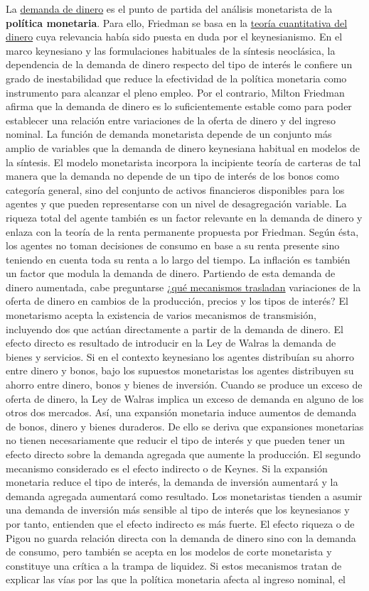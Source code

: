 \documentclass{nuevotema}
\begin{document}
La \underline{demanda de dinero} es el punto de partida del análisis monetarista de la \textbf{política monetaria}. Para ello, Friedman se basa en la \underline{teoría cuantitativa del dinero} cuya relevancia había sido puesta en duda por el keynesianismo. En el marco keynesiano y las formulaciones habituales de la síntesis neoclásica, la dependencia de la demanda de dinero respecto del tipo de interés le confiere un grado de inestabilidad que reduce la efectividad de la política monetaria como instrumento para alcanzar el pleno empleo. Por el contrario, Milton Friedman afirma que la demanda de dinero es lo suficientemente estable como para poder establecer una relación entre variaciones de la oferta de dinero y del ingreso nominal. La función de demanda monetarista depende de un conjunto más amplio de variables que la demanda de dinero keynesiana habitual en modelos de la síntesis. El modelo monetarista incorpora la incipiente teoría de carteras de tal manera que la demanda no depende de un tipo de interés de los bonos como categoría general, sino del conjunto de activos financieros disponibles para los agentes y que pueden representarse con un nivel de desagregación variable. La riqueza total del agente también es un factor relevante en la demanda de dinero y enlaza con la teoría de la renta permanente propuesta por Friedman. Según ésta, los agentes no toman decisiones de consumo en base a su renta presente sino teniendo en cuenta toda su renta a lo largo del tiempo. La inflación es también un factor que modula la demanda de dinero. Partiendo de esta demanda de dinero aumentada, cabe preguntarse ¿\underline{qué mecanismos trasladan} variaciones de la oferta de dinero en cambios de la producción, precios y los tipos de interés? El monetarismo acepta la existencia de varios mecanismos de transmisión, incluyendo dos que actúan directamente a partir de la demanda de dinero. El efecto directo es resultado de introducir en la Ley de Walras la demanda de bienes y servicios. Si en el contexto keynesiano los agentes distribuían su ahorro entre dinero y bonos, bajo los supuestos monetaristas los agentes distribuyen su ahorro entre dinero, bonos y bienes de inversión. Cuando se produce un exceso de oferta de dinero, la Ley de Walras implica un exceso de demanda en alguno de los otros dos mercados. Así, una expansión monetaria induce aumentos de demanda de bonos, dinero y bienes duraderos. De ello se deriva que expansiones monetarias no tienen necesariamente que reducir el tipo de interés y que pueden tener un efecto directo sobre la demanda agregada que aumente la producción. El segundo mecanismo considerado es el efecto indirecto o de Keynes. Si la expansión monetaria reduce el tipo de interés, la demanda de inversión aumentará y la demanda agregada aumentará como resultado. Los monetaristas tienden a asumir una demanda de inversión más sensible al tipo de interés que los keynesianos y por tanto, entienden que el efecto indirecto es más fuerte. El efecto riqueza o de Pigou no guarda relación directa con la demanda de dinero sino con la demanda de consumo, pero también se acepta en los modelos de corte monetarista y constituye una crítica a la trampa de liquidez. Si estos mecanismos tratan de explicar las vías por las que la política monetaria afecta al ingreso nominal, el 
\end{document}
